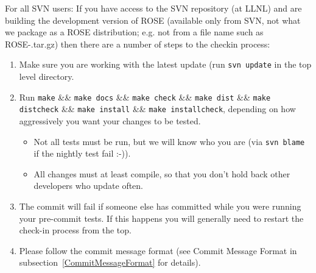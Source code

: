 For all SVN users:
   If you have access to the SVN repository (at LLNL) and are building the development 
version of ROSE (available only from SVN, not what we package as a ROSE distribution; 
e.g. not from a file name such as ROSE-\VersionNumber.tar.gz) then 
there are a number of steps to the checkin process:
\begin{enumerate}
   \item Make sure you are working with the latest update (run {\tt svn update} in the top
    level directory.


   \item Run {\tt make} \&\& {\tt make docs} \&\& {\tt make check} \&\&
   {\tt make dist} \&\& 
         {\tt make distcheck} \&\& {\tt make install} \&\& {\tt make installcheck}, depending
         on how aggressively you want your changes to be tested.
   \begin{itemize}
      \item Not all tests must be run, but we will know who you are (via {\tt svn blame} 
            if the nightly test fail :-)).
      \item All changes must at least compile, so that you don't hold back other
            developers who update often.
   \end{itemize}
   \item The commit will fail if someone else has committed while you were running
         your pre-commit tests. If this happens you will generally need to restart
         the check-in process from the top.
   \item Please follow the commit message format (see Commit Message Format in 
         subsection~\ref{CommitMessageFormat} for details).


\end{enumerate}

